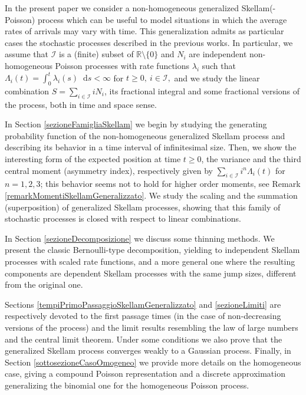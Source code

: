 \documentclass[12pt, twoside, english, headsepline]{article}
\newcommand*\dif{\mathop{}\!\mathrm{d}}  %
\theoremstyle{definition} %
\numberwithin{equation}{section} %
\begin{document}
In the present paper we consider a non-homogeneous generalized Skellam(-Poisson) process which can be useful to model situations in which the average rates of arrivals may vary with time. This generalization admits as particular cases the stochastic processes described in the previous works. In particular, we assume that $\mathcal{I}$ is a (finite) subset of $\mathbb{R}\setminus \{0\}$ and $N_i$ are independent non-homogeneous Poisson processes with rate functions $\lambda_i$ such that $\Lambda_i(t) = \int_0^t\lambda_i(s)\dif s<\infty$ for $t\ge0,\ i\in\mathcal{I}, $ and we study the linear combination $S = \sum_{i\in\mathcal{I}} iN_i$, its fractional integral and some fractional versions of the process, both in time and space sense.

In Section \ref{sezioneFamigliaSkellam} we begin by studying the generating probability function of the non-homogeneous generalized Skellam process and describing its behavior in a time interval of infinitesimal size. Then, we show the interesting form of the expected position at time $t\ge0$, the variance and the third central moment (asymmetry index), respectively given by $\sum_{i\in\mathcal{I}}i^n \Lambda_i(t) $ for $n=1,2,3$; this behavior seems not to hold for higher order moments, see Remark \ref{remarkMomentiSkellamGeneralizzato}.
We study the scaling and the summation (superposition) of generalized Skellam processes, showing that this family of stochastic processes is closed with respect to linear combinations. 

In Section \ref{sezioneDecomposizione} we discuss some thinning methods. We present the classic Bernoulli-type decomposition, yielding to independent Skellam processes with scaled rate functions, and a more general one where the resulting components are dependent Skellam processes with the same jump sizes, different from the original one.

Sections \ref{tempiPrimoPassaggioSkellamGeneralizzato} and \ref{sezioneLimiti} are respectively devoted to the first passage times (in the case of non-decreasing versions of the process) and the limit results resembling the law of large numbers and the central limit theorem. Under some conditions we also prove that the generalized Skellam process converges weakly to a Gaussian process. 
Finally, in Section \ref{sottosezioneCasoOmogeneo} we provide more details on the homogeneous case, giving a compound Poisson representation and a discrete approximation generalizing the binomial one for the homogeneous Poisson process. 
\end{document}
